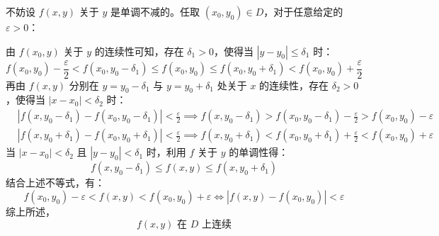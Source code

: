 \begin{myproof}
    不妨设 $f(x, y)$ 关于 $y$ 是单调不减的。任取 $(x_0, y_0) \in D$，对于任意给定的 $\varepsilon > 0$：

    由 $f(x_0, y)$ 关于 $y$ 的连续性可知，存在 $\delta_1 > 0$，使得当 $|y - y_0| \le \delta_1$ 时：
    \begin{equation}
        f(x_0, y_0) - \frac{\varepsilon}{2} < f(x_0, y_0 - \delta_1) \le f(x_0, y_0) \le f(x_0, y_0 + \delta_1) < f(x_0, y_0) + \frac{\varepsilon}{2}
    \end{equation}
    再由 $f(x, y)$ 分别在 $y = y_0 - \delta_1$ 与 $y = y_0 + \delta_1$ 处关于 $x$ 的连续性，存在 $\delta_2 > 0$，使得当 $|x - x_0| < \delta_2$ 时：
    \begin{equation}
        \begin{aligned}
             & |f(x, y_0 - \delta_1) - f(x_0, y_0 - \delta_1)| < \frac{\varepsilon}{2} \implies f(x, y_0 - \delta_1) > f(x_0, y_0 - \delta_1) - \frac{\varepsilon}{2} > f(x_0, y_0) - \varepsilon \\
             & |f(x, y_0 + \delta_1) - f(x_0, y_0 + \delta_1)| < \frac{\varepsilon}{2} \implies f(x, y_0 + \delta_1) < f(x_0, y_0 + \delta_1) + \frac{\varepsilon}{2} < f(x_0, y_0) + \varepsilon
        \end{aligned}
    \end{equation}
    当 $|x - x_0| < \delta_2$ 且 $|y - y_0| < \delta_1$ 时，利用 $f$ 关于 $y$ 的单调性得：
    \begin{equation}
        f(x, y_0 - \delta_1) \le f(x, y) \le f(x, y_0 + \delta_1)
    \end{equation}
    结合上述不等式，有：
    \begin{equation}
        f(x_0, y_0) - \varepsilon < f(x, y) < f(x_0, y_0) + \varepsilon \iff |f(x, y) - f(x_0, y_0)| < \varepsilon
    \end{equation}
    综上所述，
    \begin{equation}
        \boxed{f(x, y) \text{ 在 } D \text{ 上连续}}
    \end{equation}
\end{myproof}


